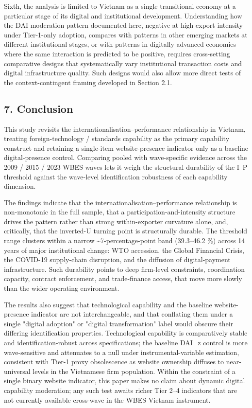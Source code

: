 \documentclass[12pt,a4paper]{article}
\begin{document}
Sixth, the analysis is limited to Vietnam as a single transitional
economy at a particular stage of its digital and institutional
development. Understanding how the DAI moderation pattern documented
here, negative at high export intensity under Tier-1-only adoption,
compares with patterns in other emerging markets at different
institutional stages, or with patterns in digitally advanced economies
where the same interaction is predicted to be positive, requires
cross-setting comparative designs that systematically vary institutional
transaction costs and digital infrastructure quality. Such designs would
also allow more direct tests of the context-contingent framing developed
in Section 2.1.

\hypertarget{7-conclusion}{%
\subsection{7. Conclusion}\label{7-conclusion}}

This study revisits the internationalisation--performance relationship
in Vietnam, treating foreign-technology / standards capability as the
primary capability construct and retaining a single-item
website-presence indicator only as a baseline digital-presence control.
Comparing pooled with wave-specific evidence across the 2009 / 2015 /
2023 WBES waves lets it weigh the structural durability of the I--P
threshold against the wave-level identification robustness of each
capability dimension.

The findings indicate that the internationalisation--performance
relationship is non-monotonic in the full sample, that a
participation-and-intensity structure drives the pattern rather than
strong within-exporter curvature alone, and, critically, that the
inverted-U turning point is structurally durable. The threshold range
clusters within a narrow \textasciitilde7-percentage-point band
(39.3--46.2 \%) across 14 years of major institutional change: WTO
accession, the Global Financial Crisis, the COVID-19 supply-chain
disruption, and the diffusion of digital-payment infrastructure. Such
durability points to deep firm-level constraints, coordination capacity,
contract enforcement, and trade-finance access, that move more slowly
than the wider operating environment.

The results also suggest that technological capability and the baseline
website-presence indicator are not interchangeable, and that conflating
them under a single "digital adoption" or "digital transformation" label
would obscure their differing identification properties. Technological
capability is comparatively stable and identification-robust across
specifications; the baseline DAI\_z control is more wave-sensitive and
attenuates to a null under instrumental-variable estimation, consistent
with Tier-1 proxy obsolescence as website ownership diffuses to
near-universal levels in the Vietnamese firm population. Within the
constraint of a single binary website indicator, this paper makes no
claim about dynamic digital capability moderation; any such test awaits
richer Tier 2--4 indicators that are not currently available cross-wave
in the WBES Vietnam instrument.
\end{document}
